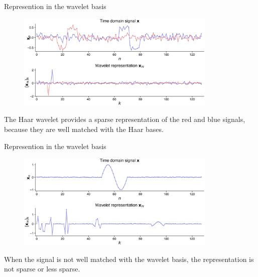 \documentclass[aspectratio=169]{beamer}
\begin{document}
\begin{frame}[t]{Represention in the wavelet basis}
  \begin{figure}[t]
    \includegraphics[width=0.85\textwidth]{figs/signal_transient_wavedec.eps}
  \end{figure}
  \vspace{-0.25cm}

  The Haar wavelet provides a sparse representation of the red and blue signals, because they are well matched with the Haar bases.
\end{frame}


\begin{frame}[t]{Represention in the wavelet basis}
  \begin{figure}[t]
    \includegraphics[width=0.85\textwidth]{figs/sine_transient_wavedec.eps}
  \end{figure}
  \vspace{-0.25cm}
  
  When the signal is not well matched with the wavelet basis, the representation is not sparse or less sparse.
\end{frame}
\end{document}
